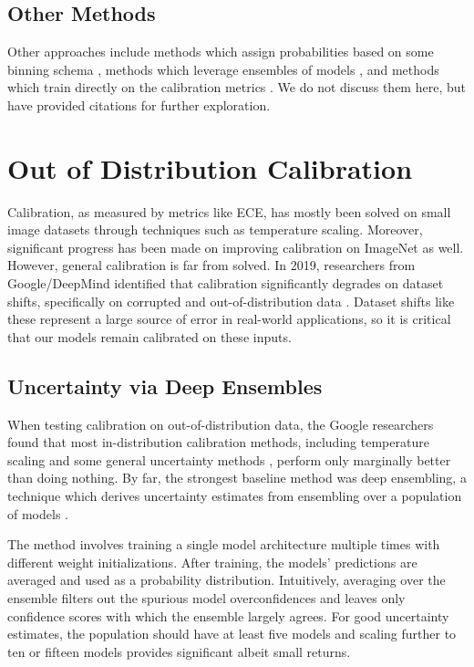 \documentclass{article}
\begin{document}
\subsection{Other Methods}
Other approaches include methods which assign probabilities based on some binning schema \cite{zadrozny2001obtaining, naeini2015obtaining}, methods which leverage ensembles of models \cite{gal2016dropout, lakshminarayanan2017simple}, and methods which train directly on the calibration metrics \cite{kumar2018trainable}. We do not discuss them here, but have provided citations for further exploration.

\section{Out of Distribution Calibration}
Calibration, as measured by metrics like ECE, has mostly been solved on small image datasets through techniques such as temperature scaling. Moreover, significant progress has been made on improving calibration on ImageNet as well. However, general calibration is far from solved. In 2019, researchers from Google/DeepMind identified that calibration significantly degrades on dataset shifts, specifically on corrupted and out-of-distribution data \cite{ovadia2019trust}. Dataset shifts like these represent a large source of error in real-world applications, so it is critical that our models remain calibrated on these inputs. 

\subsection{Uncertainty via Deep Ensembles}
When testing calibration on out-of-distribution data, the Google researchers found that most in-distribution calibration methods, including temperature scaling and some general uncertainty methods \cite{gal2016dropout, guo2017calibration}, perform only marginally better than doing nothing. By far, the strongest baseline method was deep ensembling, a technique which derives uncertainty estimates from ensembling over a population of models \cite{lakshminarayanan2017simple}. 

The method involves training a single model architecture multiple times with different weight initializations. After training, the models' predictions are averaged and used as a probability distribution. Intuitively, averaging over the ensemble filters out the spurious model overconfidences and leaves only confidence scores with which the ensemble largely agrees. For good uncertainty estimates, the population should have at least five models and scaling further to ten or fifteen models provides significant albeit small returns.
\end{document}
